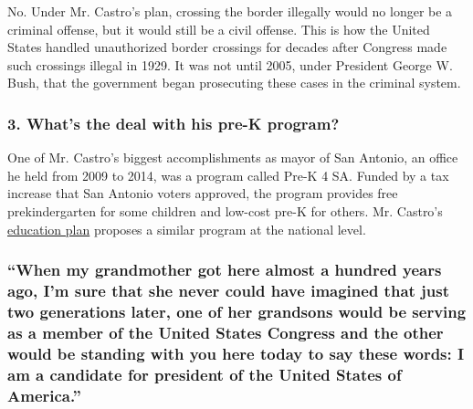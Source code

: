 No. Under Mr. Castro's plan, crossing the border illegally would no
longer be a criminal offense, but it would still be a civil offense.
This is how the United States handled unauthorized border crossings for
decades after Congress made such crossings illegal in 1929. It was not
until 2005, under President George W. Bush, that the government began
prosecuting these cases in the criminal system.

\hypertarget{3-whats-the-deal-with-his-pre-k-program}{%
\subsubsection{\texorpdfstring{\textbf{3. What's the deal with his pre-K
program?}}{3. What's the deal with his pre-K program?}}\label{3-whats-the-deal-with-his-pre-k-program}}

One of Mr. Castro's biggest accomplishments as mayor of San Antonio, an
office he held from 2009 to 2014, was a program called Pre-K 4 SA.
Funded by a tax increase that San Antonio voters approved, the program
provides free prekindergarten for some children and low-cost pre-K for
others. Mr. Castro's
\href{https://www.nytimes3xbfgragh.onion/2019/05/13/us/politics/julian-castro-education-2020.html}{education
plan} proposes a similar program at the national level.

\hypertarget{when-my-grandmother-got-here-almost-a-hundred-years-ago-im-sure-that-she-never-could-have-imagined-that-just-two-generations-later-one-of-her-grandsons-would-be-serving-as-a-member-of-the-united-states-congress-and-the-other-would-be-standing-with-you-here-today-to-say-these-words-i-am-a-candidate-for-president-of-the-united-states-of-america}{%
\subsubsection{``When my grandmother got here almost a hundred years
ago, I'm sure that she never could have imagined that just two
generations later, one of her grandsons would be serving as a member of
the United States Congress and the other would be standing with you here
today to say these words: I am a candidate for president of the United
States of
America.''}\label{when-my-grandmother-got-here-almost-a-hundred-years-ago-im-sure-that-she-never-could-have-imagined-that-just-two-generations-later-one-of-her-grandsons-would-be-serving-as-a-member-of-the-united-states-congress-and-the-other-would-be-standing-with-you-here-today-to-say-these-words-i-am-a-candidate-for-president-of-the-united-states-of-america}}

